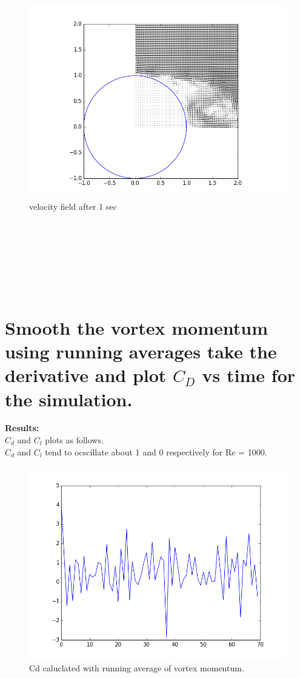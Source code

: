 \documentclass[a4paper,11pt]{article}
\begin{document}
\begin{figure}[ht]
    \centering
    \includegraphics[width=.8\linewidth]{sep_reg_5.png}
    \caption{velocity field after 1 sec}
    \label{fig:ex2}    
\end{figure}

\newpage
\indent\\
\newpage
\indent\\
\newpage
\indent\\
\newpage
\indent\\
\newpage
\indent\\
\newpage
\indent\\

\section{Smooth the vortex momentum using running averages take the derivative and  plot $C_D$ vs time for the simulation.}

\textbf{Results:}\\

\indent $C_d$ and $C_l$ plots as follows.\\
$C_d$ and $C_l$ tend to ocscillate about 1 and 0 respectively for Re = 1000.\\ 

\begin{figure}[ht]
    \centering
    \includegraphics[width=.8\linewidth]{cd_re1000.png}
    \caption{Cd caluclated with running average of vortex momentum.}
    \label{fig:cd}    
\end{figure}
\end{document}

